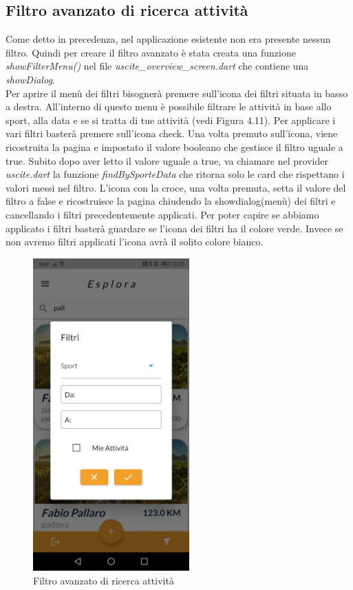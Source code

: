 \subsection{Filtro avanzato di ricerca attività}
Come detto in precedenza, nel applicazione esistente non era presente nessun filtro. Quindi per creare il filtro avanzato è stata creata una funzione \textit{showFilterMenu()} nel file \textit{uscite\_overview\_screen.dart} che contiene una \textit{showDialog}.\\
Per aprire il menù dei filtri bisognerà premere sull'icona dei filtri situata in basso a destra.
All'interno di questo menu è possibile filtrare le attività in base allo sport, alla data e se si tratta di tue attività (vedi Figura 4.11).
Per applicare i vari filtri basterà premere sull'icona check.
Una volta premuto sull'icona, viene ricostruita la pagina e impostato il valore booleano che gestisce il filtro uguale a true.
Subito dopo aver letto il valore uguale a true, va chiamare nel provider \textit{uscite.dart} la funzione \textit{findBySporteData} che ritorna solo le card che rispettano i valori messi nel filtro.
L'icona con la croce, una volta premuta, setta il valore del filtro a false e ricostruisce la pagina chiudendo la showdialog(menù) dei filtri e cancellando i filtri precedentemente applicati.
Per poter capire se abbiamo applicato i filtri basterà guardare se l'icona dei filtri ha il colore verde.
Invece se non avremo filtri applicati l'icona avrà il solito colore bianco.\\

\begin{figure}[htbp]	
	\centering
	\includegraphics[width=6cm]{immagini/filtroavanzato.jpeg}
	\caption{Filtro avanzato di ricerca attività}
	\label{fig:Filtro avanzato di ricerca attività}
\end{figure}

